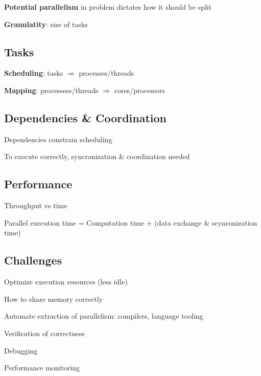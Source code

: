 \documentclass[12pt]{article}
\begin{document}
\begin{spacing}{1.5}
\begin{itemize*}
	\item \textbf{Potential parallelism} in problem dictates how it should be split
	\item \textbf{Granulatity}: size of tasks
\end{itemize*}

\subsection{Tasks}

\begin{itemize*}
	\item \textbf{Scheduling}: tasks $\Rightarrow$ processes/threads
	\item \textbf{Mapping}: processess/threads $\Rightarrow$ cores/processors
\end{itemize*}

\subsection{Dependencies \& Coordination}

\begin{itemize*}
	\item Dependencies constrain scheduling
	\item To execute correctly, syncronization \& coordination needed
\end{itemize*}

\subsection{Performance}

\begin{itemize*}
	\item Throughput vs time
	\item Parallel execution time = Computation time + (data exchange \& scynronization time)
	
\end{itemize*}

\subsection{Challenges}

\begin{itemize*}
	\item Optimize execution resources (less idle)
	\item How to share memory correctly
	\item Automate extraction of parallelism: compilers, language tooling
	\item Verification of correctness
	\item Debugging
	\item Performance monitoring 
\end{itemize*}

\end{spacing}
\end{document}
